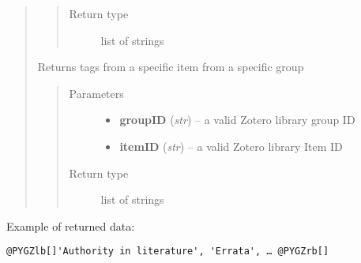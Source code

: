 \documentclass[letterpaper,10pt,english]{sphinxmanual}
\begin{document}
\begin{quote}
\begin{fulllineitems}
\begin{quote}
\begin{description}
\item[{Return type}] \leavevmode
list of strings

\end{description}\end{quote}

\end{fulllineitems}



\begin{fulllineitems}
\label{index:pyzotero.zotero.Zotero.group_item_tags}
Returns tags from a specific item from a specific group
\begin{quote}\begin{description}
\item[{Parameters}] \leavevmode\begin{itemize}
\item {} 
\textbf{groupID} (\emph{str}) -- a valid Zotero library group ID

\item {} 
\textbf{itemID} (\emph{str}) -- a valid Zotero library Item ID

\end{itemize}

\item[{Return type}] \leavevmode
list of strings

\end{description}\end{quote}

\end{fulllineitems}

\end{quote}

Example of returned data:

\begin{Verbatim}[commandchars=@\[\]]
@PYGZlb[]'Authority in literature', 'Errata', … @PYGZrb[]
\end{Verbatim}
\end{document}
